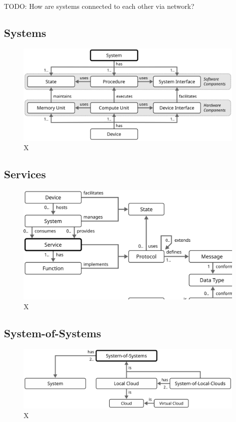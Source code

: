 TODO: How are systems connected to each other via network?

\subsection{Systems}

\begin{figure}[ht!]
  \centering
  \includegraphics{figures/system}
  \caption{
    X
  }
  \label{fig:system}
\end{figure}

\subsection{Services}

\begin{figure}[ht!]
  \centering
  \includegraphics{figures/service}
  \caption{
    X
  }
  \label{fig:service}
\end{figure}

\subsection{System-of-Systems}

\begin{figure}[ht!]
  \centering
  \includegraphics{figures/system-of-systems}
  \caption{
    X
  }
  \label{fig:system-of-systems}
\end{figure}

